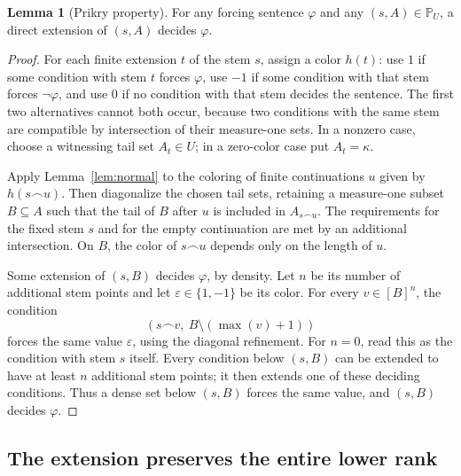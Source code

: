 \documentclass[11pt,letterpaper]{article}
\theoremstyle{definition}
\newtheorem{lemma}[definition]{Lemma}
\numberwithin{equation}{section}
\newcommand{\PP}{\mathbb P}
\newcommand{\splus}{\mathbin{\smallfrown}}
\begin{document}
\begin{lemma}[Prikry property]\label{lem:prikry}
For any forcing sentence $\varphi$ and any $(s,A)\in\PP_U$, a direct
extension of $(s,A)$ decides $\varphi$.
\end{lemma}
\begin{proof}
For each finite extension $t$ of the stem $s$, assign a color $h(t)$:
use $1$ if some condition with stem $t$ forces $\varphi$, use $-1$ if
some condition with that stem forces $\neg\varphi$, and use $0$ if no
condition with that stem decides the sentence. The first two alternatives
cannot both occur, because two conditions with the same stem are
compatible by intersection of their measure-one sets. In a nonzero case,
choose a witnessing tail set $A_t\in U$; in a zero-color case put $A_t=\kappa$.

Apply Lemma~\ref{lem:normal} to the coloring of finite continuations $u$
given by $h(s\splus u)$. Then diagonalize the chosen tail sets, retaining
a measure-one subset $B\subseteq A$ such that the tail of $B$ after $u$
is included in $A_{s\splus u}$. The requirements for the fixed stem $s$
and for the empty continuation are met by an additional intersection.
On $B$, the color of $s\splus u$ depends only on the length of $u$.

Some extension of $(s,B)$ decides $\varphi$, by density. Let $n$ be its
number of additional stem points and let $\varepsilon\in\{1,-1\}$ be
its color. For every $v\in[B]^n$, the condition
\[
 (s\splus v,\ B\setminus(\max(v)+1))
\]
forces the same value $\varepsilon$, using the diagonal refinement.
For $n=0$, read this as the condition with stem $s$ itself. Every condition
below $(s,B)$ can be extended to have at least $n$ additional stem points;
it then extends one of these deciding conditions. Thus a dense set below
$(s,B)$ forces the same value, and $(s,B)$ decides $\varphi$.
\end{proof}

\subsection{The extension preserves the entire lower rank}
\end{document}

